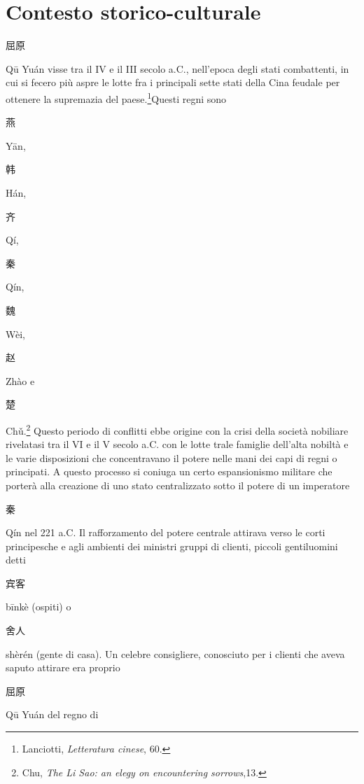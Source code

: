 \documentclass[12pt,titlepage]{article}
\begin{document}
\section{Contesto storico-culturale}
\begin{CJK*}{UTF8}{gbsn}屈原 \end{CJK*}
Qū Yuán visse tra il IV e il III secolo a.C., nell'epoca degli stati combattenti, in cui si fecero più aspre le lotte fra i principali sette stati della Cina feudale per ottenere la supremazia del paese.\footnote{Lanciotti, \emph{Letteratura cinese}, 60.}Questi regni sono 
\begin{CJK*}{UTF8}{gbsn}燕 \end{CJK*}Yān, 
\begin{CJK*}{UTF8}{gbsn}韩 \end{CJK*}Hán, 
\begin{CJK*}{UTF8}{gbsn}齐 \end{CJK*}Qí, 
\begin{CJK*}{UTF8}{gbsn}秦 \end{CJK*}Qín,
\begin{CJK*}{UTF8}{gbsn} 魏 \end{CJK*}Wèi, 
\begin{CJK*}{UTF8}{gbsn}赵 \end{CJK*}Zhào e 
\begin{CJK*}{UTF8}{gbsn}楚\end{CJK*}Chǔ.\footnote{Chu, \emph{The Li Sao: an elegy on encountering sorrows},13.}
Questo periodo di conflitti ebbe origine con la crisi della società nobiliare rivelatasi tra il VI e il V secolo a.C. con le lotte trale  famiglie dell'alta nobiltà e le varie disposizioni che concentravano il potere nelle mani dei capi di regni o principati. A questo processo si coniuga un certo espansionismo militare che porterà alla creazione di uno stato centralizzato sotto il potere di un imperatore 
\begin{CJK*}{UTF8}{gbsn}
秦\end{CJK*} Qín nel 221 a.C. Il rafforzamento del potere centrale attirava verso le corti principesche e agli ambienti dei ministri gruppi di clienti, piccoli gentiluomini detti 
\begin{CJK*}{UTF8}{gbsn}宾客 \end{CJK*}bīnkè (ospiti) o
 \begin{CJK*}{UTF8}{gbsn}舍人\end{CJK*} shèrén (gente di casa). Un celebre consigliere, conosciuto per i clienti che aveva saputo attirare era proprio 
\begin{CJK*}{UTF8}{gbsn}屈原 \end{CJK*}Qū Yuán del regno di 
\end{document}
